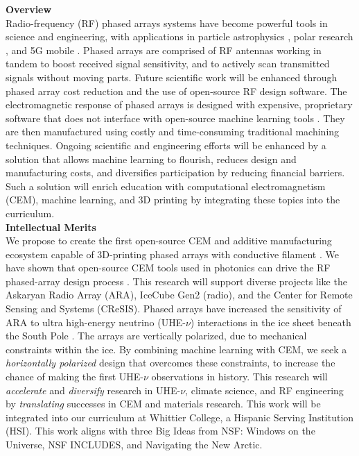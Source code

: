 \documentclass[11pt]{amsart}
\begin{document}

\noindent \textbf{Overview} \\ \noindent Radio-frequency (RF) phased arrays systems have become powerful tools in science and engineering, with applications in particle astrophysics \cite{Vieregg_2016,AVVA201746,electronics10040415,rno}, polar research \cite{arnold_2020,9670670}, and 5G mobile \cite{5G_review_paper}.  Phased arrays are comprised of RF antennas working in tandem to boost received signal sensitivity, and to actively scan transmitted signals without moving parts.  Future scientific work will be enhanced through phased array cost reduction and the use of open-source RF design software.  The electromagnetic response of phased arrays is designed with expensive, proprietary software that does not interface with open-source machine learning tools \cite{10.3390/electronics8121506}.  They are then manufactured using costly and time-consuming traditional machining techniques.  Ongoing scientific and engineering efforts will be enhanced by a solution that allows machine learning to flourish, reduces design and manufacturing costs, and diversifies participation by reducing financial barriers.  Such a solution will enrich education with computational electromagnetism (CEM), machine learning, and 3D printing by integrating these topics into the curriculum. \\

\noindent \textbf{Intellectual Merits} \\ \noindent We propose to create the first open-source CEM and additive manufacturing ecosystem capable of 3D-printing phased arrays with conductive filament \cite{10.3390/electronics8121506, yurduseven,8786183}.  We have shown that open-source CEM tools used in photonics can drive the RF phased-array design process \cite{electronics10040415,meepcon2022,10.1016/j.cpc.2009.11.008}.  This research will support diverse projects like the Askaryan Radio Array (ARA), IceCube Gen2 (radio), and the Center for Remote Sensing and Systems (CReSIS).  Phased arrays have increased the sensitivity of ARA to ultra high-energy neutrino (UHE-$\nu$) interactions in the ice sheet beneath the South Pole \cite{PhysRevD.105.122006}.  The arrays are vertically polarized, due to mechanical constraints within the ice.  By combining machine learning with CEM, we seek a \textit{horizontally polarized} design that overcomes these constraints, to increase the chance of making the first UHE-$\nu$ observations in history.  This research will \textit{accelerate} and \textit{diversify} research in UHE-$\nu$, climate science, and RF engineering by \textit{translating} successes in CEM and materials research.  This work will be integrated into our curriculum at Whittier College, a Hispanic Serving Institution (HSI).  This work aligns with three Big Ideas from NSF: Windows on the Universe, NSF INCLUDES, and Navigating the New Arctic. \\
\end{document}
